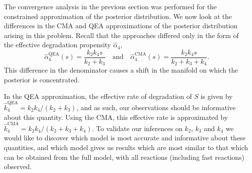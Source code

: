 \documentclass[final]{siamltex}
\begin{document}
The convergence analysis in the previous section was performed for the constrained
approximation of the posterior distribution. We now look at the
differences in the CMA and QEA approximations of the posterior distribution
arising in this problem. Recall that the approaches differed only in the form of the effective degradation propensity $\hat{\alpha}_4$,
\begin{equation}
	\hat{\alpha}_4^{\text{QEA}}(s) = \frac{k_2k_4s}{k_2+k_3} \quad \text{and} \quad \hat{\alpha}_4^{\text{CMA}}(s) = \frac{k_2k_4s}{k_2+k_3+k_4}.
\end{equation}
This difference in the denominator causes a shift in the manifold on
which the posterior is concentrated.



In the QEA approximation, the effective rate of degradation of $S$ is
given by $\hat{k}_4^{\text{QEA}} = k_2k_4/(k_2+k_3)$, and as such, our
observations should be informative about this quantity. Using the CMA,
this effective rate is approximated by $\hat{k}_4^{\text{CMA}} =
k_2k_4/(k_2+k_3+k_4)$. To validate our inferences on $k_2$, $k_3$ and
$k_4$ we would like to discover which model is most accurate and
informative about these quantities, and which model gives us results
which are most similar to that which can be obtained from the full
model, with all reactions (including fast reactions) observed.
\end{document}
